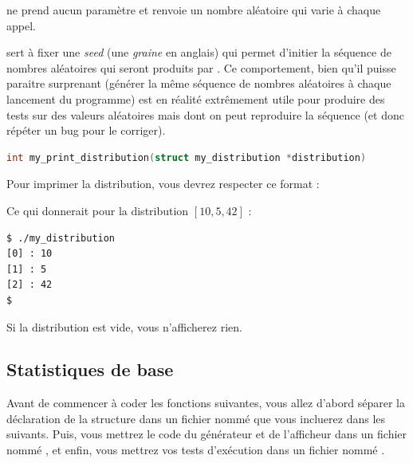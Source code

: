 \documentclass[11pt,a4paper]{article}
\begin{document}
 ne prend aucun paramètre et renvoie un nombre aléatoire qui varie à chaque appel.

\medskip

 sert à fixer une \textit{seed} (une \textit{graine} en anglais) qui permet d'initier la séquence de nombres aléatoires qui seront produits par .
Ce comportement, bien qu'il puisse paraitre surprenant (générer la même séquence de nombres aléatoires à chaque lancement du programme) est en réalité extrêmement utile pour produire des tests sur des valeurs aléatoires mais dont on peut reproduire la séquence (et donc répéter un bug pour le corriger).

\bigskip


\begin{lstlisting}[language=C,morekeywords={floor,ceil}]
int my_print_distribution(struct my_distribution *distribution) \end{lstlisting}

Pour imprimer la distribution, vous devrez respecter ce format :

\bigskip

\noindent {}

\bigskip

Ce qui donnerait pour la distribution $ [ 10, 5, 42 ] $ :

\bigskip

\lstset{language=sh}
\begin{lstlisting}[frame=single]
$ ./my_distribution
[0] : 10
[1] : 5
[2] : 42
$
\end{lstlisting}

Si la distribution est vide, vous n'afficherez rien.


\newpage


\subsection{Statistiques de base}

Avant de commencer à coder les fonctions suivantes, vous allez d'abord séparer la déclaration de la structure dans un fichier nommé  que vous incluerez dans les suivants.
Puis, vous mettrez le code du générateur et de l'afficheur dans un fichier nommé , et enfin, vous mettrez vos tests d'exécution dans un fichier nommé .
\end{document}
